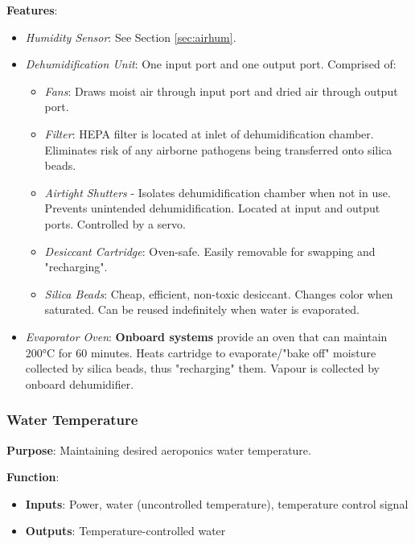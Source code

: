 \documentclass{report}
\begin{document}
\textbf{Features}:
\begin{itemize}
    \item \textit{Humidity Sensor}: See Section \ref{sec:airhum}.
    \item \textit{Dehumidification Unit}: One input port and one output port. Comprised of:
    \begin{itemize}
        \item \textit{Fans}: Draws moist air through input port and dried air through output port.
        \item \textit{Filter}: HEPA filter is located at inlet of dehumidification chamber. Eliminates risk of any airborne pathogens being transferred onto silica beads.
        \item \textit{Airtight Shutters} - Isolates dehumidification chamber when not in use. Prevents unintended dehumidification. Located at input and output ports. Controlled by a servo.
        \item \textit{Desiccant Cartridge}: Oven-safe. Easily removable for swapping and "recharging".
        \item \textit{Silica Beads}: Cheap, efficient, non-toxic desiccant. Changes color when saturated. Can be reused indefinitely when water is evaporated.
    \end{itemize}
    \item \textit{Evaporator Oven}: \textbf{Onboard systems} provide an oven that can maintain 200°C for 60 minutes. Heats cartridge to evaporate/"bake off" moisture collected by silica beads, thus "recharging" them. Vapour is collected by onboard dehumidifier.
\end{itemize}

\newpage

\subsubsection{Water Temperature}
\label{sec:watertemp}

\textbf{Purpose}: Maintaining desired aeroponics water temperature.

\textbf{Function}: 
\begin{itemize}
    \item \textbf{Inputs}: Power, water (uncontrolled temperature), temperature control signal
    \item \textbf{Outputs}: Temperature-controlled water
\end{itemize}
\end{document}
